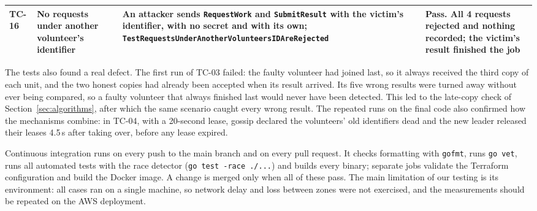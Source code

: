 \begin{table}[t]
\begin{tabular}{@{}lp{}p{}p{}@{}}
TC-16 & No requests under another volunteer's identifier & An attacker sends \texttt{RequestWork} and \texttt{SubmitResult} with the victim's identifier, with no secret and with its own; \texttt{TestRequestsUnderAnother\allowbreak VolunteersIDAreRejected} & Pass. All 4 requests rejected and nothing recorded; the victim's result finished the job \\
\bottomrule
\end{tabular}
\end{table}

The tests also found a real defect. The first run of TC-03 failed: the faulty volunteer had joined last, so it always received the third copy of each unit, and the two honest copies had already been accepted when its result arrived. Its five wrong results were turned away without ever being compared, so a faulty volunteer that always finished last would never have been detected. This led to the late-copy check of Section~\ref{sec:algorithms}, after which the same scenario caught every wrong result. The repeated runs on the final code also confirmed how the mechanisms combine: in TC-04, with a 20-second lease, gossip declared the volunteers' old identifiers dead and the new leader released their leases 4.5\,s after taking over, before any lease expired.

Continuous integration runs on every push to the main branch and on every pull request. It checks formatting with \texttt{gofmt}, runs \texttt{go vet}, runs all automated tests with the race detector (\texttt{go test -race ./...}) and builds every binary; separate jobs validate the Terraform configuration and build the Docker image. A change is merged only when all of these pass. The main limitation of our testing is its environment: all cases ran on a single machine, so network delay and loss between zones were not exercised, and the measurements should be repeated on the AWS deployment.
